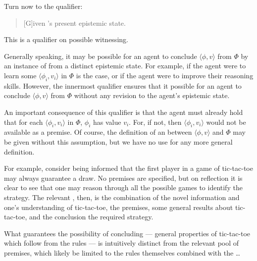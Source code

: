 \begin{note}
  Turn now to the qualifier:
  \begin{quote}
    [G]iven \vAgent{}'s present epistemic state.
  \end{quote}
  This is a qualifier on possible witnessing.

  Generally speaking, it may be possible for an agent to conclude \(\langle \phi,v \rangle\) from \(\Phi\) by an instance of \adA{} from a distinct epistemic state.
  For example, if the agent were to learn some \(\langle \phi_{i},v_{i} \rangle\) in \(\Phi\) is the case, or if the agent were to improve their reasoning skills.
  However, the innermost qualifier ensures that it possible for an agent to conclude \(\langle \phi,v \rangle\) from \(\Phi\) without any revision to the agent's epistemic state.

  An important consequence of this qualifier is that the agent must already hold that for each \(\langle \phi_{i},v_{i} \rangle\) in \(\Phi\), \(\phi_{i}\) has value \(v_{i}\).
  For, if not, then \(\langle \phi_{i},v_{i} \rangle\) would not be available as a premise.
  Of course, the definition of an \itp{} between \(\langle \phi,v \rangle\) and \(\Phi\) may be given without this assumption, but we have no use for any more general definition.
\end{note}

\begin{note}[\illu{2}]
  \color{red}
    For example, consider being informed that the first player in a game of tic-tac-toe may always guarantee a draw.
  No premises are specified, but on reflection it is clear to see that one may reason through all the possible games to identify the strategy.
  The relevant , then, is the combination of the novel information and one's understanding of tic-tac-toe, the premises, some general results about tic-tac-toe, and the conclusion the required strategy.

  What guarantees the possibility of concluding --- general properties of tic-tac-toe which follow from the rules --- is intuitively distinct from the relevant pool of premises, which likely be limited to the rules themselves combined with the \dots

\end{note}

